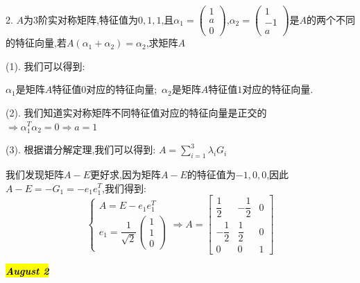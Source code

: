 2. $A$为$3$阶实对称矩阵,特征值为$0,1,1$,且$\alpha_{1}=\left( \begin{matrix}
	1\\a\\0
\end{matrix}\right)$,$\alpha_{2}=\left( \begin{matrix}
	1\\-1\\a
\end{matrix}\right)$是$A$的两个不同的特征向量,若$A(\alpha_{1}+\alpha_{2})=\alpha_{2}$,求矩阵$A$
\begin{solution}

	(1). 我们可以得到:  
	
	$\alpha_{1}$是矩阵$A$特征值$0$对应的特征向量;\ $\alpha_{2}$是矩阵$A$特征值$1$对应的特征向量.
	
	(2). 我们知道实对称矩阵不同特征值对应的特征向量是正交的$\Rightarrow \alpha_{1}^{T}\alpha_{2}=0\Rightarrow a=1$
	
	(3). 根据谱分解定理,我们可以得到:  $A=\sum\limits_{i=1}^{3}\lambda_{i}G_{i}$
	
	我们发现矩阵$A-E$更好求,因为矩阵$A-E$的特征值为$-1,0,0$,因此$A-E=-G_{1}=-e_{1}e_{1}^{T}$,我们得到:  
	$$\left\lbrace
	\begin{array}{l}
		A=E-e_{1}e_{1}^{T}\\
		e_{1}=\dfrac{1}{\sqrt{2}}\left( \begin{matrix}
			1\\1\\0
		\end{matrix}\right) 
	\end{array}
	\right. \Rightarrow A=\left[ \begin{matrix}
		\dfrac{1}{2}&-\dfrac{1}{2}&0\\
		-\dfrac{1}{2}&\dfrac{1}{2}&0\\
		0&0&1
	\end{matrix}\right] $$
\end{solution}

\hl{\textbf{\textit{August 2}}}

